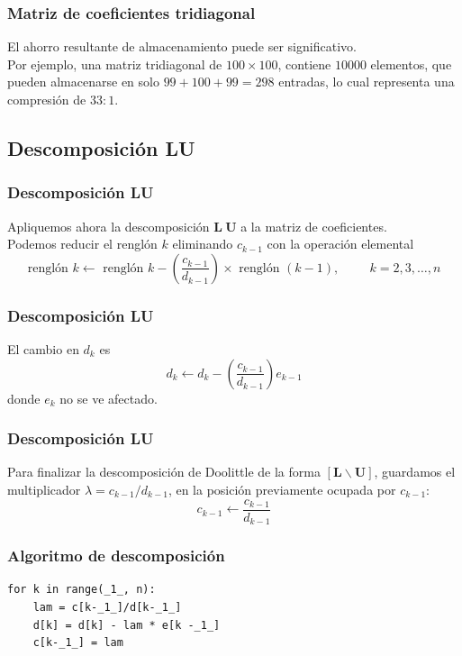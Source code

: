 \begin{frame}
\frametitle{Matriz de coeficientes tridiagonal}
El ahorro resultante de almacenamiento puede ser significativo.
\\
\bigskip
Por ejemplo, una matriz tridiagonal de $100 \times 100$, contiene $10000$ elementos, que pueden almacenarse en solo $99+100+99=298$ entradas, lo cual representa una compresión de $33:1$.
\end{frame}
\subsection{Descomposición LU}
\begin{frame}
\frametitle{Descomposición LU}
Apliquemos ahora la descomposición $\mathbf{L\: U}$ a la matriz de coeficientes.
\\
\medskip
Podemos reducir el renglón $k$ eliminando $c_{k-1}$ con la operación elemental
\[ \mbox{renglón } k \leftarrow \mbox{ renglón } k - \left( \dfrac{c_{k-1}}{d_{k-1}} \right) \times \mbox{ renglón } (k-1), \hspace{1cm} k= 2, 3,\ldots,n \]
\end{frame}
\begin{frame}
\frametitle{Descomposición LU}
El cambio en $d_{k}$ es
\[ d_{k} \leftarrow d_{k} - \left( \dfrac{c_{k-1}}{d_{k-1}} \right) e_{k-1}\]
donde $e_{k}$ no se ve afectado.
\end{frame}
\begin{frame}
\frametitle{Descomposición LU}
Para finalizar la descomposición de Doolittle de la forma $[\mathbf{L} \backslash \mathbf{U} ]$, guardamos el multiplicador $\lambda = c_{k-1}/d_{k-1}$, en la posición previamente ocupada por $c_{k-1}$:
\[ c_{k-1} \leftarrow \dfrac{c_{k-1}}{d_{k-1}}\]
\end{frame}
\begin{frame}[fragile]
\frametitle{Algoritmo de descomposición}
\begin{lstlisting}[caption=Descomposición LU, style=FormattedNumber, basicstyle=\linespread{1.1}\ttfamily=\small, columns=fullflexible]
for k in range(_1_, n):
    lam = c[k-_1_]/d[k-_1_]
    d[k] = d[k] - lam * e[k -_1_]
    c[k-_1_] = lam
\end{lstlisting}
\end{frame}

